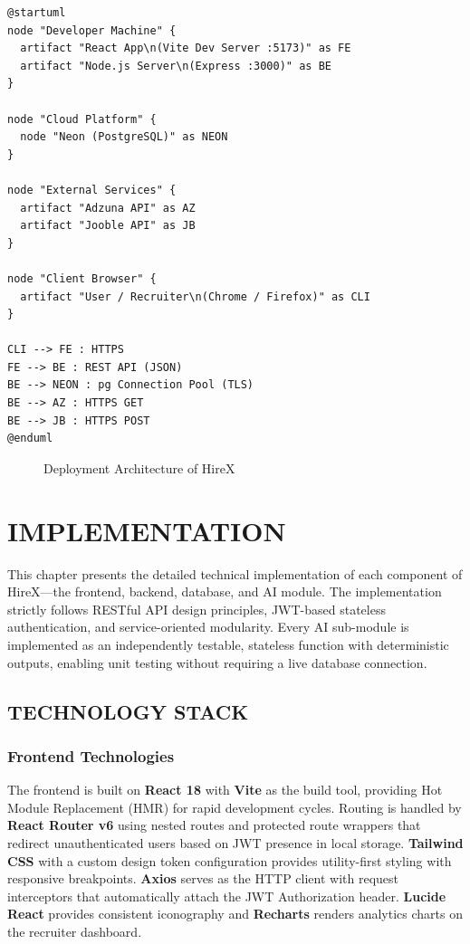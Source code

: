 \documentclass[12pt,a4paper]{report}
\newcommand{\figurebox}[2]{%
    \fbox{\parbox{#1}{%
        \centering\vspace{1.5cm}\small [FIGURE: #2]\vspace{1.5cm}%
    }}%
}
\begin{document}
\begin{verbatim}
@startuml
node "Developer Machine" {
  artifact "React App\n(Vite Dev Server :5173)" as FE
  artifact "Node.js Server\n(Express :3000)" as BE
}

node "Cloud Platform" {
  node "Neon (PostgreSQL)" as NEON
}

node "External Services" {
  artifact "Adzuna API" as AZ
  artifact "Jooble API" as JB
}

node "Client Browser" {
  artifact "User / Recruiter\n(Chrome / Firefox)" as CLI
}

CLI --> FE : HTTPS
FE --> BE : REST API (JSON)
BE --> NEON : pg Connection Pool (TLS)
BE --> AZ : HTTPS GET
BE --> JB : HTTPS POST
@enduml
\end{verbatim}

\begin{figure}[H]
    \centering
    \figurebox{0.80\textwidth}{Deployment Diagram}
    \caption{Deployment Architecture of HireX}
    \label{fig:deployment}
\end{figure}

\chapter{IMPLEMENTATION}

This chapter presents the detailed technical implementation of each component of HireX---the frontend, backend, database, and AI module. The implementation strictly follows RESTful API design principles, JWT-based stateless authentication, and service-oriented modularity. Every AI sub-module is implemented as an independently testable, stateless function with deterministic outputs, enabling unit testing without requiring a live database connection.

\section{TECHNOLOGY STACK}

\subsection{Frontend Technologies}
The frontend is built on \textbf{React 18} with \textbf{Vite} as the build tool, providing Hot Module Replacement (HMR) for rapid development cycles. Routing is handled by \textbf{React Router v6} using nested routes and protected route wrappers that redirect unauthenticated users based on JWT presence in local storage. \textbf{Tailwind CSS} with a custom design token configuration provides utility-first styling with responsive breakpoints. \textbf{Axios} serves as the HTTP client with request interceptors that automatically attach the JWT Authorization header. \textbf{Lucide React} provides consistent iconography and \textbf{Recharts} renders analytics charts on the recruiter dashboard.
\end{document}
